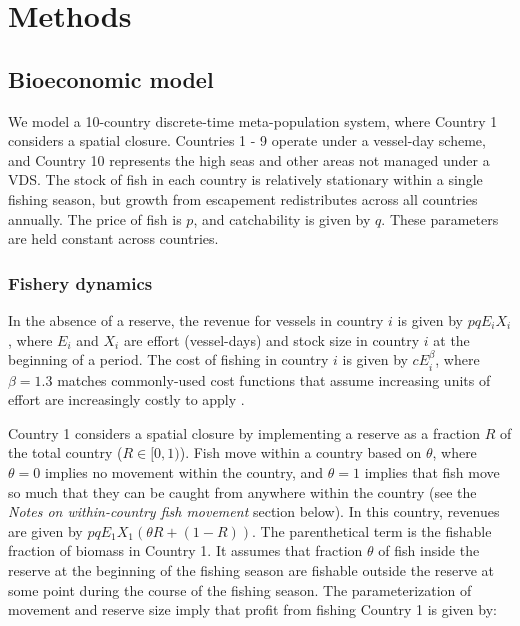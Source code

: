 \documentclass[12pt]{article}
\begin{document}
\clearpage

\section{Methods}

\subsection{Bioeconomic model}

We model a 10-country discrete-time meta-population system, where Country 1 considers a spatial closure. Countries 1 - 9 operate under a vessel-day scheme, and Country 10 represents the high seas and other areas not managed under a VDS. The stock of fish in each country is relatively stationary within a single fishing season, but  growth from escapement redistributes across all countries annually. The price of fish is $p$, and catchability is given by $q$. These parameters are held constant across countries.

\subsubsection{Fishery dynamics}

In the absence of a reserve, the revenue for vessels in country $i$ is given by $pqE_iX_i$, where $E_i$ and $X_i$ are effort (vessel-days) and stock size in country $i$ at the beginning of a period. The cost of fishing in country $i$ is given by $cE_i^\beta$, where $\beta = 1.3$ matches commonly-used cost functions that assume increasing units of effort are increasingly costly to apply \cite{costello_2016}.

Country 1 considers a spatial closure by implementing a reserve as a fraction $R$ of the total country ($R \in[0,1)$). Fish move within a country based on $\theta$, where $\theta = 0$ implies no movement within the country, and $\theta = 1$ implies that fish move so much that they can be caught from anywhere within the country (see the \emph{Notes on within-country fish movement} section below). In this country, revenues are given by $pqE_1X_1(\theta R + (1 - R))$. The parenthetical term is the fishable fraction of biomass in Country 1. It assumes that fraction $\theta$ of fish inside the reserve at the beginning of the fishing season are fishable outside the reserve at some point during the course of the fishing season. The parameterization of movement and reserve size imply that profit from fishing Country 1 is given by:
\end{document}
